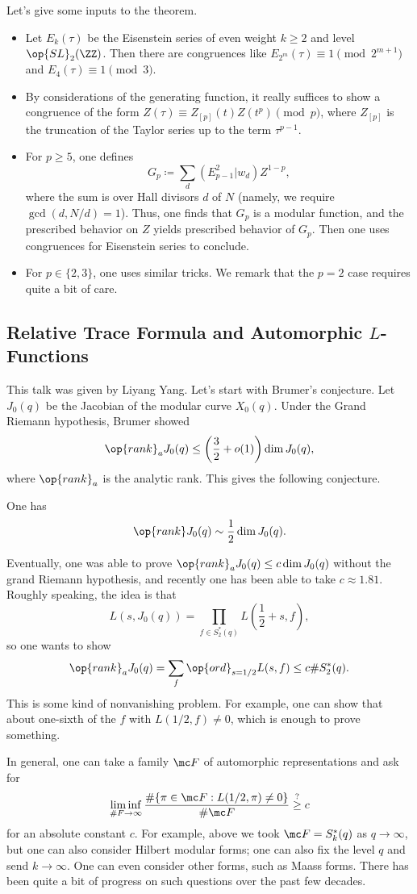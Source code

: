 \documentclass{article}
\begin{document}
Let's give some inputs to the theorem.
\begin{itemize}
	\item Let $E_k(\tau)$ be the Eisenstein series of even weight $k\ge2$ and level $\op{SL}_2(\ZZ)$. Then there are congruences like $E_{2^m}(\tau)\equiv1\pmod{2^{m+1}}$ and $E_4(\tau)\equiv1\pmod3$.
	\item By considerations of the generating function, it really suffices to show a congruence of the form $Z(\tau)\equiv Z_{[p]}(t)Z(t^p)\pmod p$, where $Z_{[p]}$ is the truncation of the Taylor series up to the term $\tau^{p-1}$.
	\item For $p\ge5$, one defines
	\[G_p\coloneqq\sum_d\left(E_{p-1}^2|w_d\right)Z^{1-p},\]
	where the sum is over Hall divisors $d$ of $N$ (namely, we require $\gcd(d,N/d)=1$). Thus, one finds that $G_p$ is a modular function, and the prescribed behavior on $Z$ yields prescribed behavior of $G_p$. Then one uses congruences for Eisenstein series to conclude.
	\item For $p\in\{2,3\}$, one uses similar tricks. We remark that the $p=2$ case requires quite a bit of care.
\end{itemize}

\subsection{Relative Trace Formula and Automorphic \texorpdfstring{$L$}{ L}-Functions}
This talk was given by Liyang Yang. Let's start with Brumer's conjecture. Let $J_0(q)$ be the Jacobian of the modular curve $X_0(q)$. Under the Grand Riemann hypothesis, Brumer showed
\[\op{rank}_aJ_0(q)\le\left(\frac32+o(1)\right)\dim J_0(q),\]
where $\op{rank}_a$ is the analytic rank. This gives the following conjecture.
\begin{conj}[Brumer]
	One has
	\[\op{rank}J_0(q)\sim\frac12\dim J_0(q).\]
\end{conj}
Eventually, one was able to prove $\op{rank}_aJ_0(q)\le c\dim J_0(q)$ without the grand Riemann hypothesis, and recently one has been able to take $c\approx 1.81$. Roughly speaking, the idea is that
\[L(s,J_0(q))=\prod_{f\in S_2^*(q)}L\left(\frac12+s,f\right),\]
so one wants to show
\[\op{rank}_aJ_0(q)=\sum_f\op{ord}_{s=1/2}L(s,f)\le c\#S_2^*(q).\]
This is some kind of nonvanishing problem. For example, one can show that about one-sixth of the $f$ with $L(1/2,f)\ne0$, which is enough to prove something.

In general, one can take a family $\mc F$ of automorphic representations and ask for
\[\liminf_{\#F\to\infty}\frac{\#\{\pi\in\mc F:L(1/2,\pi)\ne0\}}{\#\mc F}\stackrel?\ge c\]
for an absolute constant $c$. For example, above we took $\mc F=S_k^*(q)$ as $q\to\infty$, but one can also consider Hilbert modular forms; one can also fix the level $q$ and send $k\to\infty$. One can even consider other forms, such as Maass forms. There has been quite a bit of progress on such questions over the past few decades.
\end{document}

